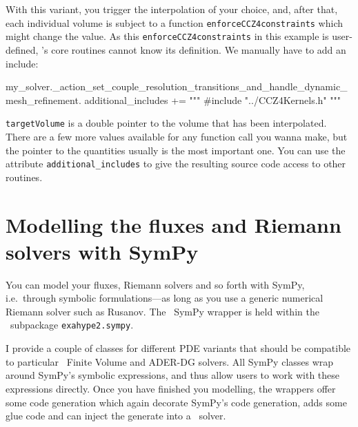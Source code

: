 \noindent
With this variant, you trigger the interpolation of your choice, and, after
that, each individual volume is subject to a function
\texttt{enforceCCZ4constraints} which might change the value.
As this \texttt{enforceCCZ4constraints} in this example is user-defined,
\ExaHyPE's core routines cannot know its definition.
We manually have to add an include:

\begin{code}
my_solver._action_set_couple_resolution_transitions_and_handle_dynamic_mesh_refinement.
 additional_includes += """ 
   #include "../CCZ4Kernels.h"
 """
\end{code}



\noindent
\texttt{targetVolume} is a double pointer to the volume that has been interpolated.
There are a few more values available for any function call you wanna make, but
the pointer to the quantities usually is the most important one.
You can use the attribute \texttt{additional\_includes} to give the resulting
source code access to other routines.



\section{Modelling the fluxes and Riemann solvers with SymPy}

You can model your fluxes, Riemann solvers and so forth with SymPy, 
i.e.~through symbolic formulations---as long as you use a generic numerical
Riemann solver such as Rusanov.
The \ExaHyPE\ SymPy wrapper is
held within the \ExaHyPE\ subpackage \texttt{exahype2.sympy}.


I provide a couple of classes for different PDE variants that should be
compatible to particular \ExaHyPE\ Finite Volume and ADER-DG solvers.
All SymPy classes wrap around SymPy's symbolic expressions, and thus allow users
to work with these expressions directly.
Once you have finished you modelling, the wrappers offer some code generation
which again decorate SymPy's code generation, adds some glue code and can inject
the generate into a \Peano\ solver.


